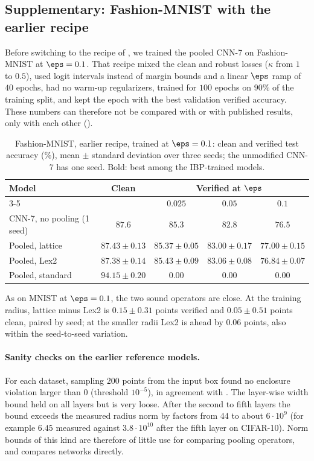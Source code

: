 \subsection{Supplementary: Fashion-MNIST with the earlier recipe}
\label{sec:fmnist}

Before switching to the recipe of , we trained the pooled CNN-7 on Fashion-MNIST \cite{xiao2017fmnist} at $\eps=0.1$. That recipe mixed the clean and robust losses ($\kappa$ from $1$ to $0.5$), used logit intervals instead of margin bounds and a linear $\eps$ ramp of $40$ epochs, had no warm-up regularizers, trained for $100$ epochs on $90\%$ of the training split, and kept the epoch with the best validation verified accuracy. These numbers can therefore not be compared with  or with published results, only with each other ().

\begin{table}[h]
\centering
\caption{Fashion-MNIST, earlier recipe, trained at $\eps=0.1$: clean and verified test accuracy (\%), mean $\pm$ standard deviation over three seeds; the unmodified CNN-7 has one seed. Bold: best among the IBP-trained models.}
\label{tab:fmnist}
\begin{tabular}{lcccc}
\toprule
Model & Clean & \multicolumn{3}{c}{Verified at $\eps$} \\
\cmidrule(lr){3-5}
 & & $0.025$ & $0.05$ & $0.1$ \\
\midrule
CNN-7, no pooling (1 seed) & $\mathbf{87.6}$ & $85.3$ & $82.8$ & $76.5$ \\
Pooled, lattice  & $87.43\pm0.13$ & $85.37\pm0.05$ & $83.00\pm0.17$ & $\mathbf{77.00\pm0.15}$ \\
Pooled, Lex2     & $87.38\pm0.14$ & $\mathbf{85.43\pm0.09}$ & $\mathbf{83.06\pm0.08}$ & $76.84\pm0.07$ \\
Pooled, standard & $94.15\pm0.20$ & $0.00$ & $0.00$ & $0.00$ \\
\bottomrule
\end{tabular}
\end{table}

As on MNIST at $\eps=0.1$, the two sound operators are close. At the training radius, lattice minus Lex2 is $0.15\pm0.31$ points verified and $0.05\pm0.51$ points clean, paired by seed; at the smaller radii Lex2 is ahead by $0.06$ points, also within the seed-to-seed variation.

\paragraph{Sanity checks on the earlier reference models.} For each dataset, sampling $200$ points from the input box found no enclosure violation larger than $0$ (threshold $10^{-5}$), in agreement with . The layer-wise width bound held on all layers but is very loose. After the second to fifth layers the bound exceeds the measured radius norm by factors from $44$ to about $6\cdot10^{9}$ (for example $6.45$ measured against $3.8\cdot10^{10}$ after the fifth layer on CIFAR-10). Norm bounds of this kind are therefore of little use for comparing pooling operators, and  compares networks directly.

